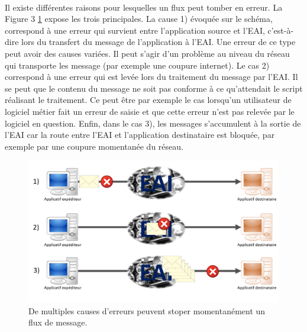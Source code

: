			\paragraph{}%
			Il existe différentes raisons pour lesquelles un flux peut tomber en erreur.
			La Figure 3 \ref{Figure 3} expose les trois principales. La cause 1) évoquée
			sur le schéma, correspond à une erreur qui survient entre l'application source et l'EAI,
			c'est-à-dire lors du transfert du message de l'application à l'EAI. Une
			erreur de ce type peut avoir des causes variées. Il peut s'agir d'un problème
			au niveau du réseau qui transporte les message (par exemple une coupure
			internet). Le cas 2) correspond à une erreur qui est levée
			lors du traitement du message par l'EAI. Il se peut que le contenu du
			message ne soit pas conforme à ce qu'attendait le script réalisant le
			traitement. Ce peut être par exemple le cas lorsqu'un utilisateur de
			logiciel métier fait un erreur de saisie et que cette erreur n'est pas
			relevée par le logiciel en question. Enfin, dans le cas 3), les messages
			s'accumulent à la sortie de l'EAI car la route entre l'EAI et l'application
			destinataire est bloquée, par exemple par une coupure momentanée du réseau.
			\begin{figure}[!h]
				\centering
				\includegraphics[width=15cm]{../img/error_1.png}
				\caption{\label{Figure 3} De multiples causes d'erreurs peuvent stoper
				momentanément un flux de message.}
			\end{figure}
			
